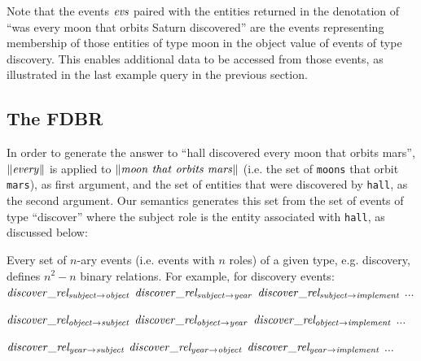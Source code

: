 \documentclass[../main.tex]{subfiles}
\begin{document}
\begin{refsection}


Note that the events $\mathit{evs}$ paired with the entities returned in the denotation of ``was every moon that orbits Saturn discovered'' are the events representing membership of those entities of type moon in the object value of events of type discovery. This enables additional data to be accessed from those events, as illustrated in the last example query in the previous section.

\subsection{The FDBR}

In order to generate the  answer to ``hall discovered every moon that orbits mars'', $\lVert \mathit{every} \rVert$ is applied to $\meaningof{moon\ that\ orbits\ mars}$ (i.e. the set of \texttt{moons} that orbit \texttt{mars}), as first argument, and  the set of entities  that were discovered by \texttt{hall}, as the second argument. Our semantics generates this set from the set of events of type ``discover'' where the subject role is the entity associated with \texttt{hall}, as discussed below:

\noindent Every set of $n$-ary events (i.e. events with $n$ roles) of a given type, e.g. discovery, defines $n^2 - n$ binary relations. For example, for discovery events: \\

\noindent $\mathit{discover\_rel_{subject \rightarrow object}}$ $\mathit{discover\_rel_{subject \rightarrow year}}$ $\mathit{discover\_rel_{subject \rightarrow implement}}$ $\dots$

\noindent $\mathit{discover\_rel_{object \rightarrow subject}}$ $\mathit{discover\_rel_{object \rightarrow year}}$ $\mathit{discover\_rel_{object \rightarrow implement}}$ $\dots$

\noindent $\mathit{discover\_rel_{year \rightarrow subject}}$ $\mathit{discover\_rel_{year \rightarrow object}}$ $\mathit{discover\_rel_{year \rightarrow implement}}$ $\dots$ \\


\end{refsection}
\end{document}

